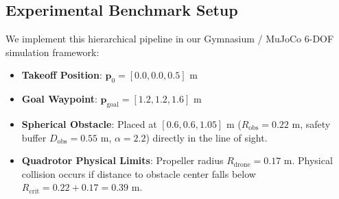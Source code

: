 \documentclass[11pt,a4paper]{article}
\begin{document}
\subsection{Experimental Benchmark Setup}
We implement this hierarchical pipeline in our Gymnasium / MuJoCo 6-DOF simulation framework:
\begin{itemize}
    \item \textbf{Takeoff Position}: $\mathbf{p}_0 = [0.0, 0.0, 0.5]\text{ m}$
    \item \textbf{Goal Waypoint}: $\mathbf{p}_{\mathrm{goal}} = [1.2, 1.2, 1.6]\text{ m}$
    \item \textbf{Spherical Obstacle}: Placed at $[0.6, 0.6, 1.05]\text{ m}$ ($R_{\mathrm{obs}} = 0.22\text{ m}$, safety buffer $D_{\mathrm{obs}} = 0.55\text{ m}$, $\alpha = 2.2$) directly in the line of sight.
    \item \textbf{Quadrotor Physical Limits}: Propeller radius $R_{\mathrm{drone}} = 0.17\text{ m}$. Physical collision occurs if distance to obstacle center falls below $R_{\mathrm{crit}} = 0.22 + 0.17 = 0.39\text{ m}$.
\end{itemize}

\begin{table}[H]
\centering
\caption{\textbf{Head-to-Head Telemetry Results in 6-DOF MuJoCo Simulation}}
\label{tab:results}
\end{table}
\end{document}
